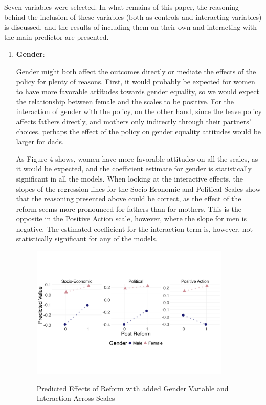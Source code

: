 \documentclass[12pt,letterpaper]{article}
\begin{document}
\vspace{0.35cm}
\noindent Seven variables were selected. In what remains of this paper, the reasoning behind the inclusion of these variables (both as controls and interacting variables) is discussed, and the results of including them on their own and interacting with the main predictor are presented. 

\begin{enumerate}
	\item \textbf{Gender}: 
	
	\noindent Gender might both affect the outcomes directly or mediate the effects of the policy for plenty of reasons. First, it would probably be expected for women to have more favorable attitudes towards gender equality, so we would expect the relationship between female and the scales to be positive. For the interaction of gender with the policy, on the other hand, since the leave policy affects fathers directly, and mothers only indirectly through their partners' choices, perhaps the effect of the policy on gender equality attitudes would be larger for dads. 
	
	\noindent As Figure 4 shows, women have more favorable attitudes on all the scales, as it would be expected, and the coefficient estimate for gender is statistically significant in all the models. When looking at the interactive effects, the slopes of the regression lines for the Socio-Economic and Political Scales show that the reasoning presented above could be correct, as the effect of the reform seems more pronounced for fathers than for mothers. This is the opposite in the Positive Action scale, however, where the slope for men is negative. The estimated coefficient for the interaction term is, however, not statistically significant for any of the models. 
	
	\begin{figure}[H]
		\centering
		\caption{Predicted Effects of Reform with added Gender Variable and Interaction Across Scales}
		\vspace{-1cm}
		\includegraphics[width=0.9\textwidth]{gender_plot}
		\label{fig:gender_plot}
	\end{figure}
	

\end{enumerate}
\end{document}
